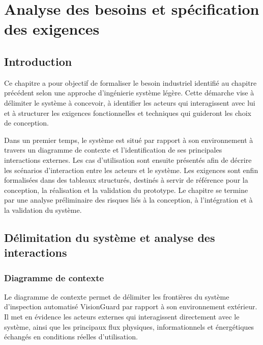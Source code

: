
\chapter{Analyse des besoins et spécification des exigences}

\section{Introduction}

Ce chapitre a pour objectif de formaliser le besoin industriel identifié au chapitre
précédent selon une approche d'ingénierie système légère. Cette démarche vise à délimiter
le système à concevoir, à identifier les acteurs qui interagissent avec lui et à structurer
les exigences fonctionnelles et techniques qui guideront les choix de conception.

Dans un premier temps, le système est situé par rapport à son environnement à travers un
diagramme de contexte et l'identification de ses principales interactions externes. Les cas
d'utilisation sont ensuite présentés afin de décrire les scénarios d'interaction entre les
acteurs et le système. Les exigences sont enfin formalisées dans des tableaux structurés,
destinés à servir de référence pour la conception, la réalisation et la validation du
prototype. Le chapitre se termine par une analyse préliminaire des risques liés à la
conception, à l'intégration et à la validation du système.

\section{Délimitation du système et analyse des interactions}

\subsection{Diagramme de contexte}

Le diagramme de contexte permet de délimiter les frontières du système d'inspection
automatisé VisionGuard par rapport à son environnement extérieur. Il met en évidence les
acteurs externes qui interagissent directement avec le système, ainsi que les principaux
flux physiques, informationnels et énergétiques échangés en conditions réelles
d'utilisation.

